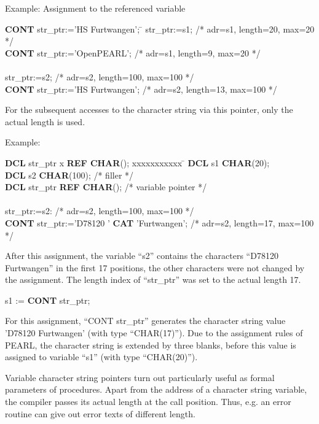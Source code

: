 Example: Assignment to the referenced variable

\begin{tabbing}
{\bf CONT} str\_ptr:='HS Furtwangen'; \= \kill
str\_ptr:=s1; \> /* adr=s1, length=20, max=20 */ \\
{\bf CONT} str\_ptr:='OpenPEARL'; \> /* adr=s1, length=9, max=20 */ \\
 \> \\
str\_ptr:=s2; \> /* adr=s2, length=100, max=100 */ \\
{\bf CONT} str\_ptr:='HS Furtwangen'; \> /* adr=s2, length=13, max=100 */
\end{tabbing}

For the subsequent accesses to the character string via this pointer,
only the actual length is used.

Example:

\begin{tabbing}
{\bf DCL} str\_ptr x \= {\bf REF CHAR}(); xxxxxxxxxxx \= \kill
{\bf DCL} s1 \> {\bf CHAR}(20); \> \\
{\bf DCL} s2 \> {\bf CHAR}(100); \> /* filler */ \\
{\bf DCL} str\_ptr \> {\bf REF CHAR}(); \> /* variable pointer */       \\
 \> \> \\
str\_ptr:=s2: \> \> /* adr=s2, length=100, max=100 */ \\
{\bf CONT} str\_ptr:='D78120 ' {\bf CAT} 'Furtwangen'; \> \> /* adr=s2, length=17, max=100 */
\end{tabbing}

After this assignment, the variable ``s2'' contains the characters
``D78120 Furtwangen'' in the first 17 positions, the other characters
were not changed by the assignment. The length index of ``str\_ptr'' was
set to the actual length 17.

s1 := {\bf CONT} str\_ptr;

For this assignment, ``CONT str\_ptr'' generates the character string
value 'D78120 Furtwangen' (with type ``CHAR(17)''). Due to the assignment
rules of PEARL, the character string is extended by three blanks, before
this value is assigned to variable ``s1'' (with type ``CHAR(20)'').

Variable character string pointers turn out particularly useful as
formal parameters of procedures. Apart from the address of a character
string variable, the compiler passes its actual length at the call
position.  Thus, e.g. an error routine can give out error texts of
different length.

